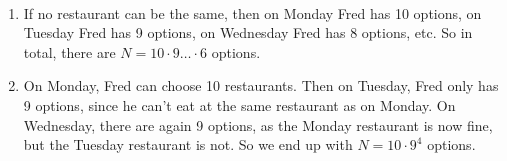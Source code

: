 

\setcounter{theorem}{2}
\begin{exercise} [BH.1.3]
\begin{solution}~
	\begin{enumerate}
		\item If no restaurant can be the same, then on Monday Fred has 10 options, on Tuesday Fred has 9 options, on Wednesday Fred has 8 options, etc. So in total, there are $N=10\cdot 9\ldots\cdot 6$ options.
		\item On Monday, Fred can choose 10 restaurants. Then on Tuesday, Fred only has 9 options, since he can't eat at the same restaurant as on Monday. On Wednesday, there are again 9 options, as the Monday restaurant is now fine, but the Tuesday restaurant is not. So we end up with $N=10\cdot 9^4$ options.
	\end{enumerate}
\end{solution}
\end{exercise}



